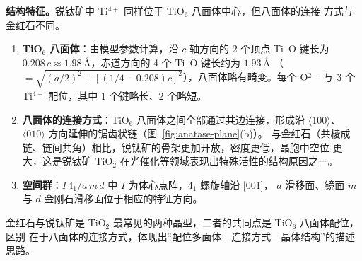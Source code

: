 \textbf{结构特征。}锐钛矿中 Ti$^{4+}$ 同样位于 TiO$_6$ 八面体中心，但八面体的连接
方式与金红石不同。

\begin{enumerate}[label=（\arabic*）]
  \item \textbf{TiO$_6$ 八面体}：由模型参数计算，沿 $c$ 轴方向的 2 个顶点 Ti--O 键长为
    $0.208\,c\approx1.98$\,\AA，赤道方向的 4 个 Ti--O 键长约为 $1.93$\,\AA
    （$=\sqrt{(a/2)^2+[(1/4-0.208)c]^2}$），八面体略有畸变。每个 O$^{2-}$ 与 3 个
    Ti$^{4+}$ 配位，其中 1 个键略长、2 个略短。
  \item \textbf{八面体的连接方式}：TiO$_6$ 八面体之间全部通过共边连接，形成沿
    $\langle100\rangle$、$\langle010\rangle$ 方向延伸的锯齿状链（图~\ref{fig:anatase-plane}(b)）。
    与金红石（共棱成链、链间共角）相比，锐钛矿的骨架更加开放，密度更低，晶胞中空位
    更大，这是锐钛矿 TiO$_2$ 在光催化等领域表现出特殊活性的结构原因之一。
  \item \textbf{空间群}：$I\,4_1/a\,m\,d$ 中 $I$ 为体心点阵，$4_1$ 螺旋轴沿 [001]，
    $a$ 滑移面、镜面 $m$ 与 $d$ 金刚石滑移面位于相应的特征方向。
\end{enumerate}

金红石与锐钛矿是 TiO$_2$ 最常见的两种晶型，二者的共同点是 TiO$_6$ 八面体配位，区别
在于八面体的连接方式，体现出``配位多面体—连接方式—晶体结构''的描述思路。
